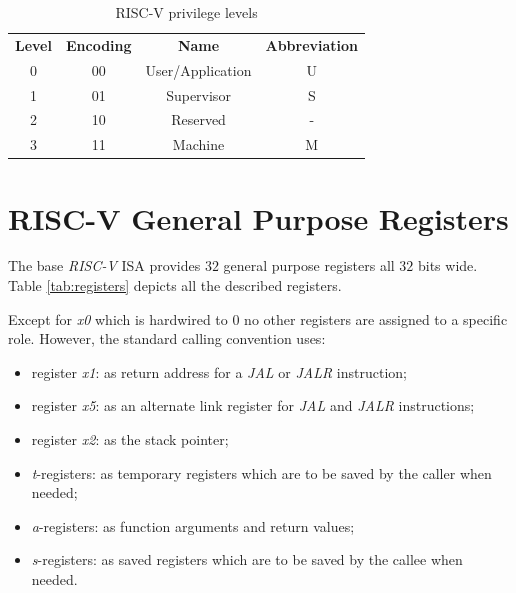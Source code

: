 \begin{table}
  \centering
  \begin{tabular}{|c|c|c|c|}
    \hline
    \textbf{Level}  & \textbf{Encoding} & \textbf{Name}    & \textbf{Abbreviation} \\
    \hhline{====} 0 & 00                & User/Application & U                     \\
    \hline
    1               & 01                & Supervisor       & S                     \\
    \hline
    2               & 10                & Reserved         & -                     \\
    \hline
    3               & 11                & Machine          & M                     \\
    \hline
  \end{tabular}
  \caption{RISC-V privilege levels}
  \label{tab:priv}
\end{table}

\section{RISC-V General Purpose Registers}
\label{sec:riscv_reg}

The base \textit{RISC-V} ISA provides $32$ general purpose registers all $32$ bits
wide. Table \ref{tab:registers} depicts all the described registers.

Except for \textit{x0} which is hardwired to $0$ no other registers are assigned
to a specific role. However, the standard calling convention uses:
\begin{itemize}
  \item register \textit{x1}: as return address for a \textit{JAL} or \textit{JALR}
    instruction;

  \item register \textit{x5}: as an alternate link register for \textit{JAL} and
    \textit{JALR} instructions;

  \item register \textit{x2}: as the stack pointer;

  \item \textit{t}-registers: as temporary registers which are to be saved by the
    caller when needed;

  \item \textit{a}-registers: as function arguments and return values;

  \item \textit{s}-registers: as saved registers which are to be saved by the callee
    when needed.
\end{itemize}

